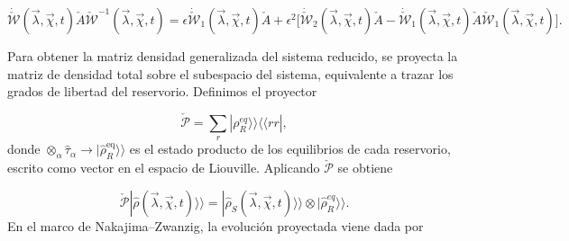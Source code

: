 \begin{appendixs}
\begin{equation}
\dot{\check{\mathcal{W}}}(\vec{\lambda},\vec{\chi},t)\check{A}\check{\mathcal{W}}^{-1}(\vec{\lambda},\vec{\chi},t) = \epsilon \dot{\check{\mathcal{W}}}_{1}(\vec{\lambda},\vec{\chi},t)\check{A} + \epsilon^{2}\big[\dot{\check{\mathcal{W}}}_{2}(\vec{\lambda},\vec{\chi},t)\check{A} - \dot{\check{\mathcal{W}}}_{1}(\vec{\lambda},\vec{\chi},t)\check{A}\check{\mathcal{W}}_{1}(\vec{\lambda},\vec{\chi},t) \big].
\label{apendix2Wproperty}
\end{equation}

Para obtener la matriz densidad generalizada del sistema reducido, se proyecta la matriz de densidad total sobre el subespacio del sistema, equivalente a trazar los grados de libertad del reservorio. Definimos el proyector

\begin{equation*}
\check{\mathcal{P}} = \sum_{r}|\rho_{R}^{eq} \rangle \rangle \langle \langle rr|,
\end{equation*}
donde \(\otimes_{\alpha} \hat{\tau}_{\alpha} \to |\hat{\rho}_{R}^{\mathrm{eq}} \rangle\rangle\) es el estado producto de los equilibrios de cada reservorio, escrito como vector en el espacio de Liouville. Aplicando \(\check{\mathcal{P}}\) se obtiene

\begin{equation*}
\check{\mathcal{P}}|\hat{\rho}(\vec{\lambda},\vec{\chi},t) \rangle \rangle = |\hat{\rho}_{S}(\vec{\lambda},\vec{\chi},t)\rangle \rangle \otimes |\hat{\rho}^{eq}_{R}\rangle \rangle .
\end{equation*}
En el marco de Nakajima–Zwanzig, la evolución proyectada viene dada por


\end{appendixs}
